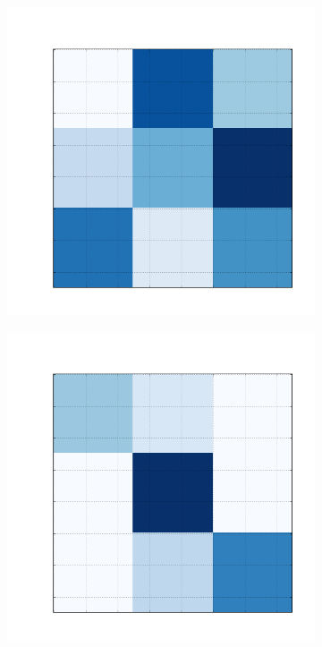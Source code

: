 \documentclass[
    12pt,                %
    oneside,            %
    a4paper,            %
    english,            %
    brazil                %
    ]{abntex2ppgsi}
\begin{document}
\begin{figure}[H]
\begin{subfigure}[b]{0.18\textwidth}
        \caption{}
    \end{subfigure}
    \begin{subfigure}[b]{0.18\textwidth}
        \includegraphics[width=\textwidth]{img/c-reconstruction-fnmtf.png}
        \caption{}
    \end{subfigure}
    \begin{subfigure}[b]{0.18\textwidth}
        \includegraphics[width=\textwidth]{img/d-reconstruction-fnmtf.png}

\end{subfigure}
\end{figure}
\end{document}
